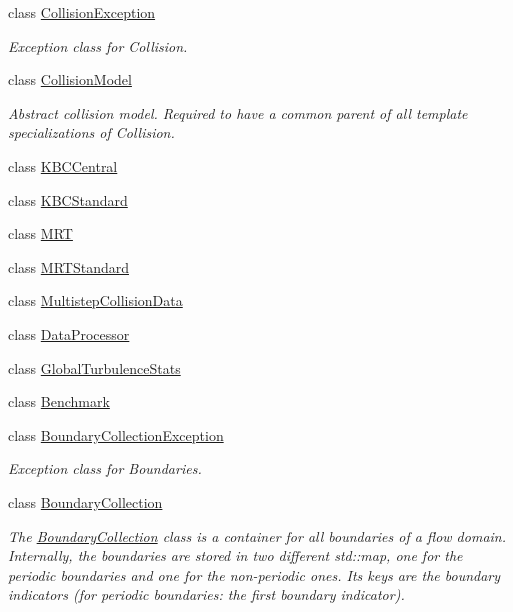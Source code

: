 \begin{DoxyCompactItemize}
class \hyperlink{classnatrium_1_1CollisionException}{CollisionException}
\begin{DoxyCompactList}\small\item\em Exception class for Collision. \item\end{DoxyCompactList}\item 
class \hyperlink{classnatrium_1_1CollisionModel}{CollisionModel}
\begin{DoxyCompactList}\small\item\em Abstract collision model. Required to have a common parent of all template specializations of Collision. \item\end{DoxyCompactList}\item 
class \hyperlink{classnatrium_1_1KBCCentral}{KBCCentral}
\item 
class \hyperlink{classnatrium_1_1KBCStandard}{KBCStandard}
\item 
class \hyperlink{classnatrium_1_1MRT}{MRT}
\item 
class \hyperlink{classnatrium_1_1MRTStandard}{MRTStandard}
\item 
class \hyperlink{classnatrium_1_1MultistepCollisionData}{MultistepCollisionData}
\item 
class \hyperlink{classnatrium_1_1DataProcessor}{DataProcessor}
\item 
class \hyperlink{classnatrium_1_1GlobalTurbulenceStats}{GlobalTurbulenceStats}
\item 
class \hyperlink{classnatrium_1_1Benchmark}{Benchmark}
\item 
class \hyperlink{classnatrium_1_1BoundaryCollectionException}{BoundaryCollectionException}
\begin{DoxyCompactList}\small\item\em Exception class for Boundaries. \item\end{DoxyCompactList}\item 
class \hyperlink{classnatrium_1_1BoundaryCollection}{BoundaryCollection}
\begin{DoxyCompactList}\small\item\em The \hyperlink{classnatrium_1_1BoundaryCollection}{BoundaryCollection} class is a container for all boundaries of a flow domain. Internally, the boundaries are stored in two different std::map, one for the periodic boundaries and one for the non-\/periodic ones. Its keys are the boundary indicators (for periodic boundaries: the first boundary indicator). \item\end{DoxyCompactList}\item 

\end{DoxyCompactItemize}
